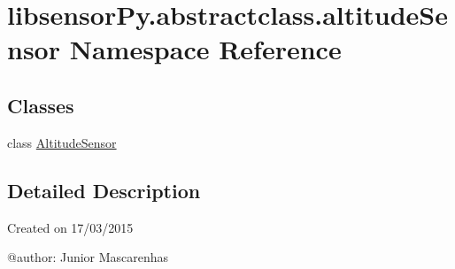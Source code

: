 \hypertarget{namespacelibsensorPy_1_1abstractclass_1_1altitudeSensor}{}\section{libsensor\+Py.\+abstractclass.\+altitude\+Sensor Namespace Reference}
\label{namespacelibsensorPy_1_1abstractclass_1_1altitudeSensor}
\subsection*{Classes}
\begin{DoxyCompactItemize}
\item 
class \hyperlink{classlibsensorPy_1_1abstractclass_1_1altitudeSensor_1_1AltitudeSensor}{Altitude\+Sensor}
\end{DoxyCompactItemize}


\subsection{Detailed Description}
\begin{DoxyVerb}Created on 17/03/2015

@author: Junior Mascarenhas
\end{DoxyVerb}
 